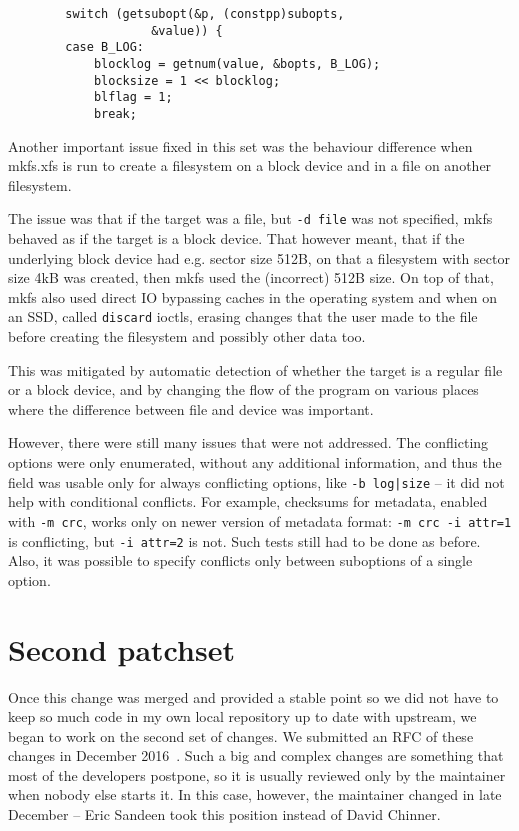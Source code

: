\begin{desciption}
\begin{lstlisting}
		switch (getsubopt(&p, (constpp)subopts,
					&value)) {
		case B_LOG:
			blocklog = getnum(value, &bopts, B_LOG);
			blocksize = 1 << blocklog;
			blflag = 1;
			break;
\end{lstlisting}

Another important issue fixed in this set was the behaviour difference when
mkfs.xfs is run to create a filesystem on a block device and in a file on
another filesystem.

The issue was that if the target was a file, but {\tt -d file} was not
specified, mkfs behaved as if the target is a block device. That however
meant, that if the underlying block device had e.g. sector size 512B, on
that a filesystem with sector size 4kB was created, then mkfs used the
(incorrect) 512B size. On top of that, mkfs also used direct IO bypassing
caches in the operating system and when on an SSD, called {\tt discard}
ioctls, erasing changes that the user made to the file before
creating the filesystem and possibly other data too.

This was mitigated by automatic detection of whether the target is a
regular file or a block device, and by changing the flow of the program on
various places where the difference between file and device was important.

However, there were still many issues that were not addressed. The
conflicting options were only enumerated, without any additional
information, and thus the field was usable only for always conflicting
options, like {\tt -b log|size} -- it did not help with conditional conflicts.
For example, checksums for metadata, enabled with {\tt -m crc}, works only
on newer version of metadata format: {\tt -m crc -i attr=1} is conflicting,
but {\tt -i attr=2} is not. Such tests still had to be done as before.
Also, it was possible to specify conflicts only between suboptions of a
single option.


\section{Second patchset}\label{chap:refactoring:second}

Once this change was merged and provided a stable point so we did not have to
keep so much code in my own local repository up to date with upstream, we
began to work on the second set of changes. We submitted an
RFC of these
changes in December 2016~\cite{secondSetRFC}. Such a big and complex
changes are something that most of the developers postpone, so it is
usually reviewed only by the maintainer when nobody else starts it. In this
case, however, the maintainer changed in late December -- Eric Sandeen took
this position instead of David Chinner.


\end{desciption}
